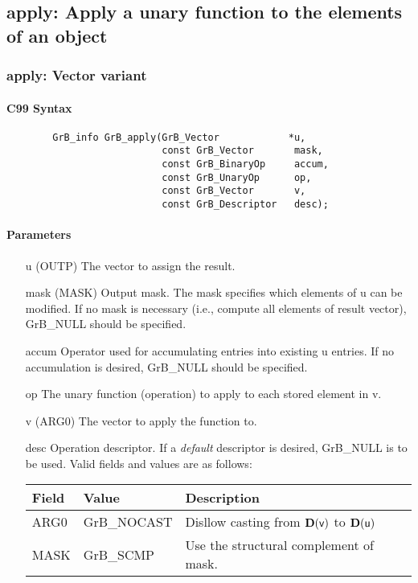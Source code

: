 \subsection{{\sf apply}: Apply a unary function to the elements of an object}


\subsubsection{{\sf apply}: Vector variant}
\paragraph{C99 Syntax}

\begin{verbatim}
        GrB_info GrB_apply(GrB_Vector            *u,
                           const GrB_Vector       mask,
                           const GrB_BinaryOp     accum,
                           const GrB_UnaryOp      op,
                           const GrB_Vector       v,
                           const GrB_Descriptor   desc);
\end{verbatim}

\paragraph{Parameters}

\begin{itemize}[leftmargin=1.1in]
    \item[{\sf u}]   ({\sf OUTP}) The vector to assign the result.

    \item[{\sf mask}] ({\sf MASK}) Output mask. The mask
    specifies which elements of {\sf u} can be modified.
    If no mask is necessary (i.e., compute all elements of result
    vector), {\sf GrB\_NULL} should be specified.

    \item[{\sf accum}]  Operator used for accumulating entries into existing {\sf u} entries. 
			If no accumulation is desired, {\sf GrB\_NULL} should be specified.

    \item[{\sf op}]    The unary function (operation) to apply to each stored element in {\sf v}.
    \item[{\sf v}]   ({\sf ARG0}) The vector to apply the function to.
    \item[{\sf desc}]   Operation descriptor. If a
    \emph{default} descriptor is desired, {\sf GrB\_NULL} is to be
    used.  Valid fields and values are as follows: \\
    \begin{tabular}{lll}
    Field  & Value & Description \\
    \hline
    {\sf ARG0} & {\sf GrB\_NOCAST} & Disllow casting from $\bold{D}({\sf v})$ to $\bold{D}({\sf u})$ \\
    {\sf MASK} & {\sf GrB\_SCMP} & Use the structural complement of {\sf mask}. \\
    \end{tabular}
\end{itemize}

